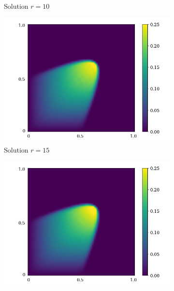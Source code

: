 \begin{figure}[ht!]
\begin{center}
\begin{subfigure}[b]{0.20\textwidth}
\begin{center}
        \end{center}
            \caption{Solution $r = 10$}
        \end{subfigure}
   \begin{subfigure}[b]{0.20\textwidth}
       \begin{center}
        \includegraphics[trim = {0, 0, 3cm, 0}, clip, width=\textwidth]{Pictures/X-rom-LE-SAE-15.png}
       \end{center}
            \caption{Solution $r = 15$}
        \end{subfigure}
   \begin{subfigure}[b]{0.20\textwidth}
       \begin{center}
        \includegraphics[trim = {0, 0, 3cm, 0}, clip, width=\textwidth]{Pictures/X-rom-LE-SAE-20.png}

\end{center}
\end{subfigure}
\end{center}
\end{figure}
